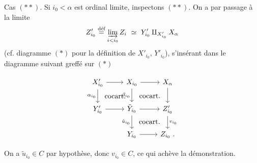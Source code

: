 Cas $(**)$. Si $i_0 < \alpha$ est ordinal limite, inspectons $(**)$. On a par passage à la limite
\[
Z'_{i_0} \overset{\text{déf}}{=} \varinjlim_{i<i_0} Z_i \ \simeq\ Y'_{i_0} \amalg_{X'_{i_0}} X_\alpha
\]
(cf. diagramme $(*)$ pour la définition de $X'_{i_0}$, $Y'_{i_0}$), s'insérant dans le diagramme suivant greffé sur $(*)$

\setcounter{footnote}{4}



\[
\begin{tikzcd}
X'_{i_0} \arrow[r] \arrow[d, "\alpha_{i_0}"'] \arrow[dr, phantom, "\cocart"] & X_{i_0} \arrow[r] \arrow[d, "\beta_{i_0}"'] \arrow[dr, phantom, "\cocart"] & X_{\alpha} \arrow[d] \\
Y'_{i_0} \arrow[r] & \tilde{Y}_{i_0} \arrow[r] \arrow[d, "\tilde{u}_{i_0}"'] \arrow[dr, phantom, "\cocart"] & Z'_{i_0} \arrow[d, "v_{i_0}"] \\
& Y_{i_0} \arrow[r] & Z_{i_0}\ .
\end{tikzcd}
\]

On a $\tilde{u}_{i_0} \in C$ par hypothèse, donc $v_{i_0} \in C$, ce qui achève la démonstration.

